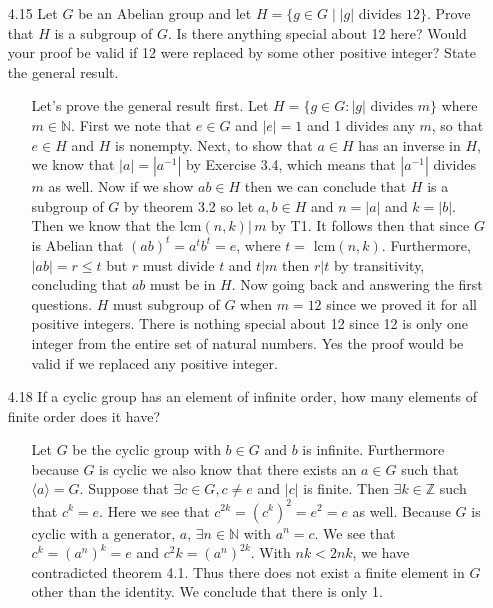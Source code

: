 \documentclass[12pt]{article}
\begin{document}
\begin{enumerate}
\item[4.15] Let $G$ be an Abelian group and let $H = \{ g \in G \mid |g| $ divides $12 \}$.
Prove that $H$ is a subgroup of $G$. Is there anything special about 12 here? Would your
proof be valid if 12 were replaced by some other positive integer? State the general result.
\begin{enumerate}
\item[] Let's prove the general result first. Let $H = \{ g \in G : |g| \mbox{ divides } m \}$ where
$m \in \mathbb{N}$. First we note that $e \in G$ and $|e| = 1$ and 1 divides any $m$, so that
$e \in H$ and $H$ is nonempty. Next, to show that $a \in H$ has an inverse in $H$, we know that 
$|a| = |a^{-1}|$ by Exercise 3.4, which means that $|a^{-1}|$ divides $m$ as well. Now if we show 
$ab \in H$ then we can conclude that $H$ is a subgroup of $G$ by theorem 3.2 so let $a, b \in H$ 
and $n = |a|$ and $k = |b|$. Then we know that the lcm$(n, k) |\, m$ by T1. It follows then that 
since $G$ is Abelian that $(ab)^t = a^tb^t = e$, where $t = $ lcm$(n, k)$. Furthermore, 
$|ab| = r \leq t$ but $r$ must divide $t$ and $t | m$ then $r | t$ by transitivity, concluding 
that $ab$ must be in $H$. Now going back and answering the first questions. $H$ must subgroup 
of $G$ when $m = 12$ since we proved it for all positive integers. There is nothing special 
about 12 since 12 is only one integer from the entire set of natural numbers. Yes the proof 
would be valid if we replaced any positive integer.
\end{enumerate}

\item[4.18] If a cyclic group has an element of infinite order, how many elements of finite order does it have?
\begin{enumerate}
\item[] Let $G$ be the cyclic group with $b \in G$ and $b$ is infinite. Furthermore
because $G$ is cyclic we also know that there exists an $a \in G$ such that $\langle a
\rangle = G$. Suppose that $\exists c \in G, c \neq e$ and $|c|$ is finite. Then
$\exists k \in \mathbb{Z}$ such that $c^k = e$. Here we see that $c^{2k} = (c^k)^2 = e^2 = e$ as well. Because $G$ is cyclic with a generator, $a$, $\exists n \in \mathbb{N}$ with $a^n = c$.
We see that $c^k = (a^n)^k = e$ and $c^2k = (a^n)^{2k}$. With $nk < 2nk$, we have contradicted
theorem 4.1. Thus there does not exist a finite element in $G$ other than the identity. We conclude
that there is only 1.
\end{enumerate}


\end{enumerate}
\end{document}
